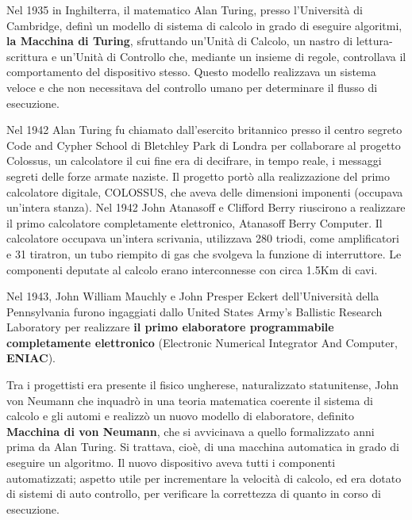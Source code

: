 \documentclass[12pt]{article}
\begin{document}
Nel 1935 in Inghilterra, il matematico Alan Turing, presso l’Università di Cambridge, definì un modello di sistema di calcolo in grado di eseguire algoritmi, \textbf{la Macchina di Turing}, sfruttando un’Unità di Calcolo, un nastro di lettura-scrittura e un’Unità di Controllo che, mediante un insieme di regole, controllava il comportamento del dispositivo stesso. Questo modello realizzava un sistema veloce e che non necessitava del controllo umano per determinare il flusso di esecuzione. \par\medskip\noindent
Nel 1942 Alan Turing fu chiamato dall’esercito britannico presso il centro segreto Code and Cypher School di Bletchley Park di Londra per collaborare al progetto Colossus, un calcolatore il cui fine era di decifrare, in tempo reale, i messaggi segreti delle forze armate naziste. Il progetto portò alla realizzazione del primo calcolatore digitale, COLOSSUS, che aveva delle dimensioni imponenti (occupava un’intera stanza).
Nel 1942 John Atanasoff e Clifford Berry riuscirono a realizzare il primo calcolatore completamente elettronico, Atanasoff Berry Computer.  Il calcolatore occupava un’intera scrivania, utilizzava 280 triodi, come amplificatori e 31 tiratron, un tubo riempito di gas che svolgeva la funzione di interruttore. Le componenti deputate al calcolo erano interconnesse con circa 1.5Km di cavi. \par\medskip\noindent
Nel 1943, John William Mauchly e John Presper Eckert dell’Università della Pennsylvania furono ingaggiati dallo United States Army’s Ballistic Research Laboratory per realizzare \textbf{il primo elaboratore programmabile completamente elettronico }(Electronic Numerical Integrator And Computer, \textbf{ENIAC}).\par\medskip\noindent
Tra i progettisti era presente il fisico ungherese, naturalizzato statunitense, John von Neumann che inquadrò in una teoria matematica coerente il sistema di calcolo e gli automi e realizzò un nuovo modello di elaboratore, definito \textbf{Macchina di von Neumann}, che si avvicinava a quello formalizzato anni prima da Alan Turing.  Si trattava, cioè, di una macchina automatica in grado di eseguire un algoritmo. Il nuovo dispositivo aveva tutti i componenti automatizzati; aspetto utile per incrementare la velocità di calcolo, ed era dotato di sistemi di auto controllo, per verificare la correttezza di quanto in corso di esecuzione.\par\medskip\noindent
\end{document}
